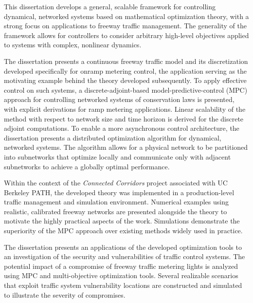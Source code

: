 This dissertation develops a general, scalable framework for controlling dynamical, networked systems based on mathematical optimization theory, with a strong focus on applications to freeway traffic management. The generality of the framework allows for controllers to consider arbitrary high-level objectives applied to systems with complex, nonlinear dynamics.

The dissertation presents a continuous freeway traffic model and its discretization developed specifically for onramp metering control, the application serving as the motivating example behind the theory developed subsequently. To apply effective control on such systems, a discrete-adjoint-based model-predictive-control (MPC) approach for controlling networked systems of conservation laws is presented, with explicit derivations for ramp metering applications. Linear scalability of the method with respect to network size and time horizon is derived for the discrete adjoint computations. To enable a more asynchronous control architecture, the dissertation presents a distributed optimization algorithm for dynamical, networked systems. The algorithm allows for a physical network to be partitioned into subnetworks that optimize locally and communicate only with adjacent subnetworks to achieve a globally optimal performance. 

Within the context of the \emph{Connected Corridors} project associated with UC Berkeley PATH, the developed theory was implemented in a production-level traffic management and simulation environment. Numerical examples using realistic, calibrated freeway networks are presented alongside the theory to motivate the highly practical aspects of the work. Simulations demonstrate the superiority of the MPC approach over existing methods widely used in practice.

The dissertation presents an applications of the developed optimization tools to an investigation of the security and vulnerabilities of traffic control systems. The potential impact of a compromise of freeway traffic metering lights is analyzed using MPC and multi-objective optimization tools. Several realizable scenarios that exploit traffic system vulnerability locations are constructed and simulated to illustrate the severity of compromises. 







